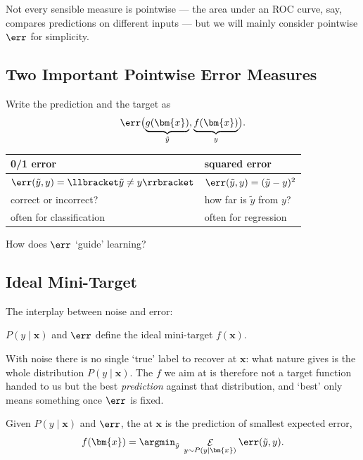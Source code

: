 Not every sensible measure is pointwise --- the area under an ROC curve, say,
compares predictions on different inputs --- but we will mainly consider
pointwise \(\err\) for simplicity.

\subsection{Two Important Pointwise Error Measures}

Write the prediction and the target as
\[
    \err\bigl( \underbrace{g(\bm{x})}_{\tilde{y}},
    \underbrace{f(\bm{x})}_{y} \bigr) .
\]

\begin{center}
    \solidrules
    \begin{tabular}{@{}l|l@{}}
        \toprule
        \textbf{0/1 error} & \textbf{squared error}\\
        \midrule
        \(\err(\tilde{y}, y) = \llbracket \tilde{y} \neq y \rrbracket\)
        & \(\err(\tilde{y}, y) = (\tilde{y} - y)^2\)\\
        correct or incorrect? & how far is \(\tilde{y}\) from \(y\)?\\
        often for classification & often for regression\\
        \bottomrule
    \end{tabular}
\end{center}

\begin{question}
    How does \(\err\) `guide' learning?
\end{question}

\subsection{Ideal Mini-Target}

The interplay between noise and error:

\begin{moral}
    \(P(y \mid \bm{x})\) and \(\err\) define the ideal mini-target
    \(f(\bm{x})\).
\end{moral}

With noise there is no single `true' label to recover at \(\bm{x}\): what
nature gives is the whole distribution \(P(y \mid \bm{x})\). The \(f\) we aim
at is therefore not a target function handed to us but the best
\emph{prediction} against that distribution, and `best' only means something
once \(\err\) is fixed.

\begin{definition}\label{def:mini-target}
    Given \(P(y \mid \bm{x})\) and \(\err\), the 
    at \(\bm{x}\) is the prediction of smallest expected error,
    \[
        f(\bm{x}) = \argmin_{\tilde{y}} \;
        \mathop{\mathcal{E}}_{y \sim P(y \mid \bm{x})} \err(\tilde{y}, y) .
    \]
\end{definition}

